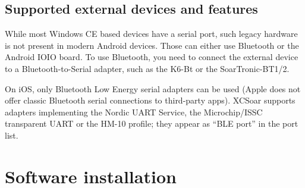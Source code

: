 \subsection*{Supported external devices and features}
\label{sec:supported-varios}

\newcommand{\y}[0]{{ $\surd$ }}
\noindent{}

While most Windows CE based devices have a serial port, such legacy
hardware is not present in modern Android devices.  Those can either
use Bluetooth or the Android IOIO board.  To use Bluetooth, you need
to connect the external device to a Bluetooth-to-Serial adapter, such
as the K6-Bt or the SoarTronic-BT1/2. %

On iOS, only Bluetooth Low Energy serial adapters can be used (Apple
does not offer classic Bluetooth serial connections to third-party
apps).  XCSoar supports adapters implementing the Nordic UART
Service, the Microchip/ISSC transparent UART or the HM-10 profile;
they appear as ``BLE port'' in the port list.


\section{Software installation}

